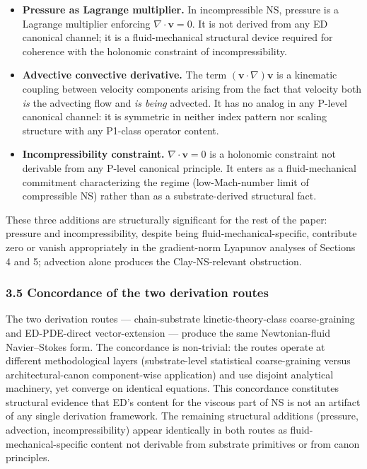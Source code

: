 \documentclass[
]{article}
\begin{document}
\begin{itemize}
\item
  \textbf{Pressure as Lagrange multiplier.} In incompressible NS,
  pressure is a Lagrange multiplier enforcing
  \(\nabla \cdot \mathbf{v} = 0\). It is not derived from any ED
  canonical channel; it is a fluid-mechanical structural device required
  for coherence with the holonomic constraint of incompressibility.
\item
  \textbf{Advective convective derivative.} The term
  \((\mathbf{v} \cdot \nabla)\mathbf{v}\) is a kinematic coupling
  between velocity components arising from the fact that velocity both
  \emph{is} the advecting flow and \emph{is being} advected. It has no
  analog in any P-level canonical channel: it is symmetric in neither
  index pattern nor scaling structure with any P1-class operator
  content.
\item
  \textbf{Incompressibility constraint.} \(\nabla \cdot \mathbf{v} = 0\)
  is a holonomic constraint not derivable from any P-level canonical
  principle. It enters as a fluid-mechanical commitment characterizing
  the regime (low-Mach-number limit of compressible NS) rather than as a
  substrate-derived structural fact.
\end{itemize}

These three additions are structurally significant for the rest of the
paper: pressure and incompressibility, despite being
fluid-mechanical-specific, contribute zero or vanish appropriately in
the gradient-norm Lyapunov analyses of Sections 4 and 5; advection alone
produces the Clay-NS-relevant obstruction.

\subsubsection{3.5 Concordance of the two derivation
routes}\label{concordance-of-the-two-derivation-routes}

The two derivation routes --- chain-substrate kinetic-theory-class
coarse-graining and ED-PDE-direct vector-extension --- produce the same
Newtonian-fluid Navier--Stokes form. The concordance is non-trivial: the
routes operate at different methodological layers (substrate-level
statistical coarse-graining versus architectural-canon component-wise
application) and use disjoint analytical machinery, yet converge on
identical equations. This concordance constitutes structural evidence
that ED's content for the viscous part of NS is not an artifact of any
single derivation framework. The remaining structural additions
(pressure, advection, incompressibility) appear identically in both
routes as fluid-mechanical-specific content not derivable from substrate
primitives or from canon principles.
\end{document}
